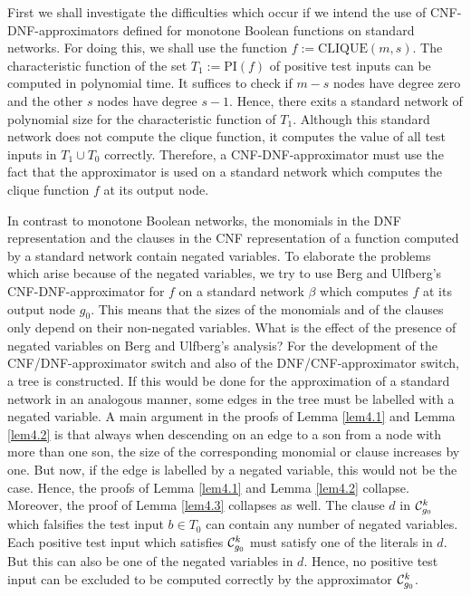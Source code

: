 \documentclass[11pt]{article}
\begin{document}
First we shall investigate the difficulties which occur if we intend the use of CNF-DNF-approximators
defined for monotone Boolean functions on standard networks.
For doing this, we shall use the function $f := \mbox{CLIQUE}(m,s)$. The characteristic function of the set
$T_1 := \mbox{PI}(f)$ of positive test inputs can be computed in polynomial time. It suffices to
check if $m - s$ nodes have degree zero and the other $s$ nodes have degree $s-1$. 
Hence, there exits a standard network of polynomial size for the characteristic function of $T_1$.
Although this standard network does not compute the clique function, it computes the value of all test inputs in
$T_1 \cup T_0$ correctly. Therefore, a CNF-DNF-approximator must use the fact that the approximator is used
on a standard network which computes the clique function $f$ at its output node.

In contrast to monotone Boolean networks, the monomials in the DNF representation and the clauses in the CNF
representation of a function computed by a standard network contain negated variables. To elaborate the problems
which arise because of the negated variables, we try to use Berg and Ulfberg's CNF-DNF-approximator for
$f$ on a standard network $\beta$ which computes $f$ at its output node $g_0$. This means that the sizes of the
monomials and of the clauses only depend on their non-negated variables. What is the effect of the presence of
negated variables on Berg and Ulfberg's analysis? For the development of the
CNF/DNF-approximator switch and also of the DNF/CNF-approximator switch, a tree is constructed. If this would
be done for the approximation of a standard network in an analogous manner, some edges in the tree must be
labelled with a negated variable. A main argument in the proofs of Lemma \ref{lem4.1} and Lemma
\ref{lem4.2} is that always when descending on an edge to a son from a node with more than one son, the size
of the corresponding monomial or clause increases by one. But now, if the edge is labelled by a negated variable,
this would not be the case. Hence, the proofs of Lemma \ref{lem4.1} and Lemma \ref{lem4.2} collapse. Moreover,
the proof of Lemma \ref{lem4.3} collapses as well. The clause $d$ in ${\cal C}_{g_0}^k$ which falsifies the
test input $b \in T_0$ can contain any number of negated variables. Each positive test input which satisfies
${\cal C}_{g_0}^k$ must satisfy one of the literals in $d$. But this can also be one of the negated variables in $d$.
Hence, no positive test input can be excluded to be computed correctly by the approximator ${\cal C}_{g_0}^k$.
\end{document}
